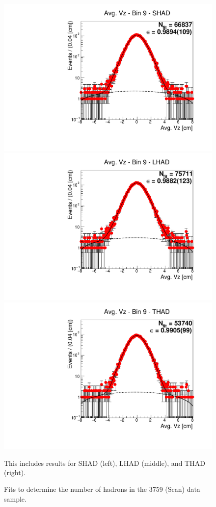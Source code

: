 \begin{figure}[H]
\centering
\includegraphics[scale=0.25]{figures/plots/nonDDbar_fit_results/scan/fit_scan_09_data_SHAD.pdf}
\hspace{-0.5cm}
\includegraphics[scale=0.25]{figures/plots/nonDDbar_fit_results/scan/fit_scan_09_data_LHAD.pdf}
\hspace{-0.5cm}
\includegraphics[scale=0.25]{figures/plots/nonDDbar_fit_results/scan/fit_scan_09_data_THAD.pdf}
\caption{Fits to determine the number of hadrons in the 3759 (Scan) data sample.}
{This includes results for SHAD (left), LHAD (middle), and THAD (right).}
\label{fig:hadron_fits_scan_09}
\end{figure}

